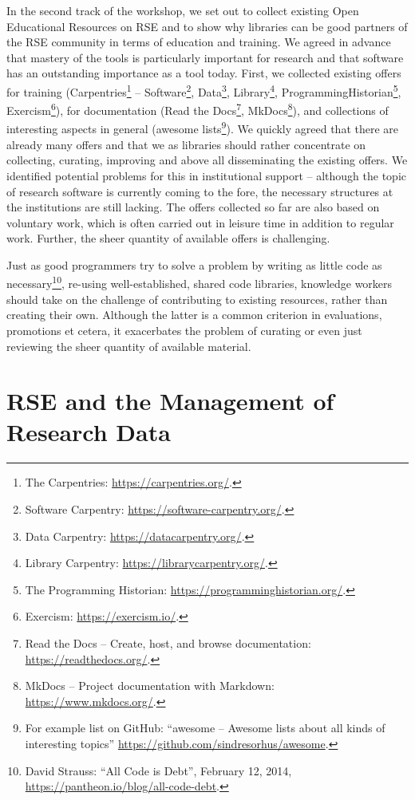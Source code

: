 \documentclass[a4paper,
fontsize=11pt,
oneside,
numbers=noperiodatend,
parskip=half-,
bibliography=totoc,
final
]{scrartcl}
\begin{document}
In the second track of the workshop, we set out to collect existing Open
Educational Resources on RSE and to show why libraries can be good
partners of the RSE community in terms of education and training. We
agreed in advance that mastery of the tools is particularly important
for research and that software has an outstanding importance as a tool
today. First, we collected existing offers for training
(Carpentries\footnote{The Carpentries: \url{https://carpentries.org/}.}
-- Software\footnote{Software Carpentry:
  \url{https://software-carpentry.org/}.}, Data\footnote{Data Carpentry:
  \url{https://datacarpentry.org/}.}, Library\footnote{Library
  Carpentry: \url{https://librarycarpentry.org/}.},
ProgrammingHistorian\footnote{The Programming Historian:
  \url{https://programminghistorian.org/}.}, Exercism\footnote{Exercism:
  \url{https://exercism.io/}.}), for documentation (Read the
Docs\footnote{Read the Docs -- Create, host, and browse documentation:
  \url{https://readthedocs.org/}.}, MkDocs\footnote{MkDocs -- Project
  documentation with Markdown: \url{https://www.mkdocs.org/}.}), and
collections of interesting aspects in general (awesome
lists\footnote{For example list on GitHub: ``awesome -- Awesome lists
  about all kinds of interesting topics''
  \url{https://github.com/sindresorhus/awesome}.}). We quickly agreed
that there are already many offers and that we as libraries should
rather concentrate on collecting, curating, improving and above all
disseminating the existing offers. We identified potential problems for
this in institutional support -- although the topic of research software
is currently coming to the fore, the necessary structures at the
institutions are still lacking. The offers collected so far are also
based on voluntary work, which is often carried out in leisure time in
addition to regular work. Further, the sheer quantity of available
offers is challenging.

Just as good programmers try to solve a problem by writing as little
code as necessary\footnote{David Strauss: ``All Code is Debt'', February
  12, 2014, \url{https://pantheon.io/blog/all-code-debt}.}, re-using
well-established, shared code libraries, knowledge workers should take
on the challenge of contributing to existing resources, rather than
creating their own. Although the latter is a common criterion in
evaluations, promotions et cetera, it exacerbates the problem of
curating or even just reviewing the sheer quantity of available
material.

\hypertarget{rse-and-the-management-of-research-data}{%
\section{RSE and the Management of Research
Data}\label{rse-and-the-management-of-research-data}}
\end{document}
